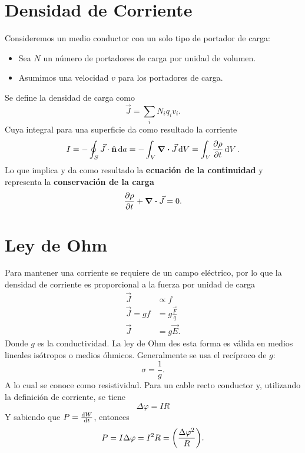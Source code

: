 \section{Densidad de Corriente}
Consideremos un medio conductor con un solo tipo de portador de carga:
\begin{itemize}
	\item Sea $N$ un número de portadores de carga por unidad de volumen.
	\item Asumimos una velocidad $v$ para los portadores de carga.
\end{itemize}
Se define la densidad de carga como
\begin{equation}
	\vec{J} = \sum _i N_i q_i v_i.
\end{equation}
Cuya integral para una superficie da como resultado la corriente
\begin{equation}
	I = -\oint _S \vec{J} \cdot \vu{n} \dd{a} = -\int _V \div{\vec{J}} \dd{V} = \int _V \pdv{\rho}{t} \dd{V}.
\end{equation}
Lo que implica y da como resultado la \textbf{ecuación de la continuidad} y representa la \textbf{conservación de la carga}
\begin{equation}
	\pdv{\rho}{t} + \div{\vec{J}} = 0.
\end{equation}


\section{Ley de Ohm}
Para mantener una corriente se requiere de un campo eléctrico, por lo que la densidad de corriente es proporcional a la fuerza por unidad de carga
\begin{align}
    \vec{J} &\propto f \\
    \vec{J} = gf &= g\frac{\vec{F}}{q} \\
    \vec{J} &= g\vec{E}.
\end{align}
Donde $g$ es la conductividad. La ley de Ohm des esta forma es válida en medios lineales isótropos o medios óhmicos. Generalmente se usa el recíproco de $g$:
\begin{equation}
    \sigma = \frac{1}{g}.
\end{equation}
A lo cual se conoce como resistividad. Para un cable recto conductor y, utilizando la definición de corriente, se tiene
\begin{equation}
    \Delta \varphi = IR
\end{equation}
Y sabiendo que $P = \dv{W}{t}$, entonces
\begin{equation}
    P = I\Delta \varphi = I^2 R = \qty(\frac{\Delta \varphi ^2}{R}).
\end{equation}

